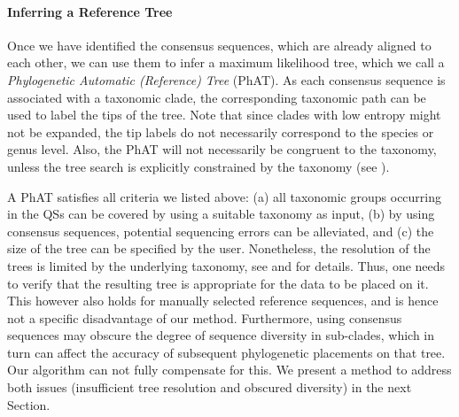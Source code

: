 \paragraph{Inferring a Reference Tree}
\label{ch:AutomaticTrees:sec:Methods:sub:PhAT:par:InferringReferenceTree}

Once we have identified the consensus sequences, which are already aligned to each other,
we can use them to infer a maximum likelihood tree, which we call a \emph{Phylogenetic Automatic (Reference) Tree} (PhAT).
As each consensus sequence is associated with a taxonomic clade,
the corresponding taxonomic path can be used to label the tips of the tree.
Note that since clades with low entropy might not be expanded,
the tip labels do not necessarily correspond to the species or genus level.
Also, the \ac{PhAT} will not necessarily be congruent to the taxonomy,
unless the tree search is explicitly constrained by the taxonomy
(see ).

A \ac{PhAT} satisfies all criteria we listed above:
(a) all taxonomic groups occurring in the \acp{QS} can be covered by using a suitable taxonomy as input,
(b) by using consensus sequences, potential sequencing errors can be alleviated, and
(c) the size of the tree can be specified by the user.
Nonetheless, the resolution of the trees is limited by the underlying taxonomy,
see 
and  for details.
Thus, one needs to verify that the resulting tree is appropriate for the data to be placed on it.
This however also holds for manually selected reference sequences,
and is hence not a specific disadvantage of our method.
Furthermore, using consensus sequences may obscure the degree of sequence diversity in sub-clades,
which in turn can affect the accuracy of subsequent phylogenetic placements on that tree.
Our algorithm can not fully compensate for this.
We present a method to address both issues (insufficient tree resolution and obscured diversity) in the next Section.


